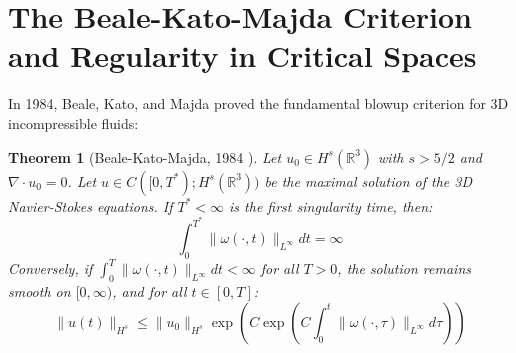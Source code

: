 \documentclass[11pt,a4paper]{article}
\newtheorem{theorem}{Theorem}[section]
\theoremstyle{definition}
\begin{document}
\section{The Beale-Kato-Majda Criterion and Regularity in Critical Spaces}
In 1984, Beale, Kato, and Majda proved the fundamental blowup criterion for 3D incompressible fluids:
\begin{theorem}[Beale-Kato-Majda, 1984 \cite{bkm1984}]
Let $u_0 \in H^s(\mathbb{R}^3)$ with $s > 5/2$ and $\nabla \cdot u_0 = 0$. Let $u \in C([0, T^*); H^s(\mathbb{R}^3))$ be the maximal solution of the 3D Navier-Stokes equations. If $T^* < \infty$ is the first singularity time, then:
\begin{equation}
\int_0^{T^*} \|\omega(\cdot, t)\|_{L^\infty} dt = \infty
\end{equation}
Conversely, if $\int_0^{T} \|\omega(\cdot, t)\|_{L^\infty} dt < \infty$ for all $T > 0$, the solution remains smooth on $[0, \infty)$, and for all $t \in [0, T]$:
\begin{equation}
\|u(t)\|_{H^s} \le \|u_0\|_{H^s} \exp \left( C \exp \left( C \int_0^t \|\omega(\cdot, \tau)\|_{L^\infty} d\tau \right) \right)
\end{equation}
\end{theorem}
\end{document}
